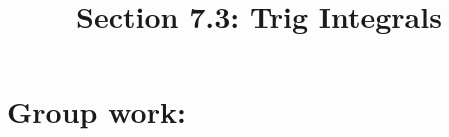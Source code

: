 \documentclass[noinstructornotes]{ximera}
\title{Section 7.3: Trig Integrals}
\begin{document}
\begin{abstract}		\end{abstract}
\maketitle



\begin{comment}
\section{Warm up:}

	\begin{freeResponse}
	
	\end{freeResponse}
	
\begin{instructorNotes}

\end{instructorNotes}
\end{comment}







\section{Group work:}
\end{document}
